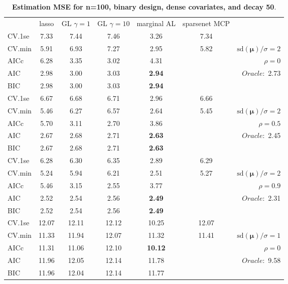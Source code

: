 \begin{table}\vspace{-.5cm}
\caption[l]{ { \bf Estimation MSE for n=100, binary design, 
dense covariates, and  decay  50}.}
\vspace{-.5cm}
\footnotesize{}
\begin{center}
\begin{tabular}{l*{5}{c}|r}
& lasso & GL $\gamma=1$ & GL $\gamma=10$ & marginal AL & sparsenet MCP  & \\
 \cline{1-7}
CV.1se & 7.33 & 7.44 & 7.46 & 3.26 & 7.34 & \\
CV.min & 5.91 & 6.93 & 7.27 & 2.95 & 5.82 &  $\mathrm{sd}(\mathbf{\mu})/\sigma=2$ \\
AICc & 6.28 & 3.35 & 3.02 & 4.31 & & $\rho=0$ \\
AIC & 2.98 & 3.00 & 3.03 & {\bf 2.94} & &  \multirow{2}{*}{$Oracle: $ 2.73} \\
BIC & 2.98 & 3.00 & 3.03 & {\bf 2.94} & &  \\
 \hline 
CV.1se & 6.67 & 6.68 & 6.71 & 2.96 & 6.66 & \\
CV.min & 5.46 & 6.27 & 6.57 & 2.64 & 5.45 &  $\mathrm{sd}(\mathbf{\mu})/\sigma=2$ \\
AICc & 5.70 & 3.11 & 2.70 & 3.86 & & $\rho=0.5$ \\
AIC & 2.67 & 2.68 & 2.71 & {\bf 2.63} & &  \multirow{2}{*}{$Oracle: $ 2.45} \\
BIC & 2.67 & 2.68 & 2.71 & {\bf 2.63} & &  \\
 \hline 
CV.1se & 6.28 & 6.30 & 6.35 & 2.89 & 6.29 & \\
CV.min & 5.24 & 5.94 & 6.21 & 2.51 & 5.27 &  $\mathrm{sd}(\mathbf{\mu})/\sigma=2$ \\
AICc & 5.46 & 3.15 & 2.55 & 3.77 & & $\rho=0.9$ \\
AIC & 2.52 & 2.54 & 2.56 & {\bf 2.49} & &  \multirow{2}{*}{$Oracle: $ 2.31} \\
BIC & 2.52 & 2.54 & 2.56 & {\bf 2.49} & &  \\
 \hline 
CV.1se & 12.07 & 12.11 & 12.12 & 10.25 & 12.07 & \\
CV.min & 11.33 & 11.94 & 12.07 & 11.32 & 11.41 &  $\mathrm{sd}(\mathbf{\mu})/\sigma=1$ \\
AICc & 11.31 & 11.06 & 12.10 & {\bf 10.12} & & $\rho=0$ \\
AIC & 11.96 & 12.05 & 12.14 & 11.78 & &  \multirow{2}{*}{$Oracle: $ 9.58} \\
BIC & 11.96 & 12.04 & 12.14 & 11.77 & &  \\

\end{tabular}
\end{center}
\end{table}
